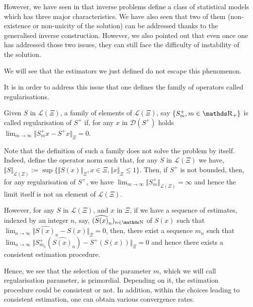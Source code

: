However, we have seen in  that inverse problems define a class of statistical models which has three major characteristics.
We have also seen that two of them (non-existence or non-unicity of the solution) can be addressed thanks to the generalised inverse construction.
However, we also pointed out that even once one has addressed those two issues, they can still face the difficulty of instability of the solution.

We will see that the estimators we just defined do not escape this phenomenon.

It is in order to address this issue that one defines the family of operators called regularisations.

\begin{de}\label{INTRO_FREQ_ESTIMATION_REGULARISATION}
Given $S$ in $\mathcal{L}(\Xi)$, a family of elements of $\mathcal{L}(\Xi)$, say $\{S_{m}^{+}, m \in \R_{+} \}$ is called regularisation of $S^{+}$ if, for any $x$ in $\mathcal{D}(S^{+})$ holds $\lim_{m \rightarrow \infty} \Vert S_{m}^{+} x - S^{+} x \Vert_{\Xi} = 0$.
\assEnd
\end{de}

Note that the definition of such a family does not solve the problem by itself.
Indeed, define the operator norm such that, for any $S$ in $\mathcal{L}(\Xi)$ we have, $\Vert S \Vert_{\mathcal{L}(\Xi)} := \sup\{\Vert S(x) \Vert_{\Xi}, x \in \Xi, \Vert x \Vert_{\Xi} \leq 1\}$.
Then, if $S^{+}$ is not bounded, then, for any regularisation of $S^{+}$, we have $\lim_{m \rightarrow \infty} \Vert S^{+}_{m} \Vert_{\mathcal{L}(\Xi)} = \infty$ and hence the limit itself is not an element of $\mathcal{L}(\Xi)$.

However, for any $S$ in $\mathcal{L}(\Xi)$, and $x$ in $\Xi$, if we have a sequence of estimates, indexed by an integer $n$, say, $(\widehat{S(x)}_{n})_{n \in \N}$ of $S(x)$ such that $\lim_{n \rightarrow \infty} \Vert \widehat{S(x)}_{n} - S(x) \Vert_{\Xi} = 0$, then, there exist a sequence $m_{n}$ such that $\lim_{n \rightarrow \infty} \Vert S^{+}_{m_{n}}(\widehat{S(x)}_{n}) - S^{+}(S(x)) \Vert_{\Xi} = 0$ and hence there exists a consistent estimation procedure.

Hence, we see that the selection of the parameter $m$, which we will call regularisation parameter, is primordial.
Depending on it, the estimation procedure could be consistent or not.
In addition, within the choices leading to consistent estimation, one can obtain various convergence rates.

